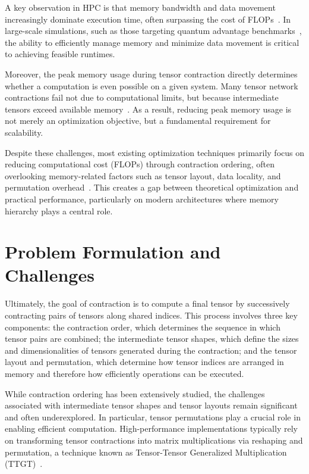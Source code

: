 A key observation in \ac{HPC} is that memory bandwidth and data movement increasingly dominate execution time, often surpassing the cost of \ac{FLOP}s~\cite{hirata2003tensor,huang2021efficient}. In large-scale simulations, such as those targeting quantum advantage benchmarks~\cite{huang2021efficient}, the ability to efficiently manage memory and minimize data movement is critical to achieving feasible runtimes.

Moreover, the peak memory usage during tensor contraction directly determines whether a computation is even possible on a given system. Many tensor network contractions fail not due to computational limits, but because intermediate tensors exceed available memory~\cite{gray2021hyper}. As a result, reducing peak memory usage is not merely an optimization objective, but a fundamental requirement for scalability.

Despite these challenges, most existing optimization techniques primarily focus on reducing computational cost (\ac{FLOP}s) through contraction ordering, often overlooking memory-related factors such as tensor layout, data locality, and permutation overhead~\cite{hirata2003tensor, schindler2020algorithms}. This creates a gap between theoretical optimization and practical performance, particularly on modern architectures where memory hierarchy plays a central role.

\section{Problem Formulation and Challenges}

Ultimately, the goal of contraction is to compute a final tensor by successively contracting pairs of tensors along shared indices. This process involves three key components: the contraction order, which determines the sequence in which tensor pairs are combined; the intermediate tensor shapes, which define the sizes and dimensionalities of tensors generated during the contraction; and the tensor layout and permutation, which determine how tensor indices are arranged in memory and therefore how efficiently operations can be executed.

While contraction ordering has been extensively studied, the challenges associated with intermediate tensor shapes and tensor layouts remain significant and often underexplored. In particular, tensor permutations play a crucial role in enabling efficient computation. High-performance implementations typically rely on transforming tensor contractions into matrix multiplications via reshaping and permutation, a technique known as Tensor-Tensor Generalized Multiplication (TTGT)~\cite{DBLP:journals/corr/SpringerB16}.

